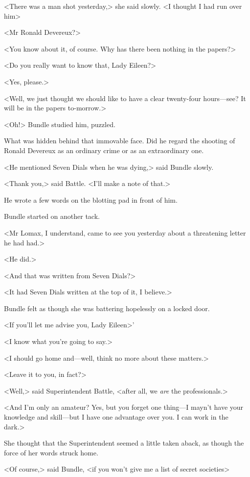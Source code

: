 <There was a man shot yesterday,> she said slowly. <I thought I had run over him\longdash>

<Mr Ronald Devereux?>

<You know about it, of course. Why has there been nothing in the papers?>

<Do you really want to know that, Lady Eileen?>

<Yes, please.>

<Well, we just thought we should like to have a clear twenty-four hours—see? It will be in the papers to-morrow.>

<Oh!> Bundle studied him, puzzled.

What was hidden behind that immovable face. Did he regard the shooting of Ronald Devereux as an ordinary crime or as an extraordinary one.

<He mentioned Seven Dials when he was dying,> said Bundle slowly.

<Thank you,> said Battle. <I'll make a note of that.>

He wrote a few words on the blotting pad in front of him.

Bundle started on another tack.

<Mr Lomax, I understand, came to see you yesterday about a threatening letter he had had.>

<He did.>

<And that was written from Seven Dials?>

<It had Seven Dials written at the top of it, I believe.>

Bundle felt as though she was battering hopelessly on a locked door.

<If you'll let me advise you, Lady Eileen\longdash>'

<I know what you're going to say.>

<I should go home and—well, think no more about these matters.>

<Leave it to you, in fact?>

<Well,> said Superintendent Battle, <after all, we \emph{are} the professionals.>

<And I'm only an amateur? Yes, but you forget one thing—I mayn't have your knowledge and skill—but I have one advantage over you. I can work in the dark.>

She thought that the Superintendent seemed a little taken aback, as though the force of her words struck home.

<Of course,> said Bundle, <if you won't give me a list of secret societies\longdash>


